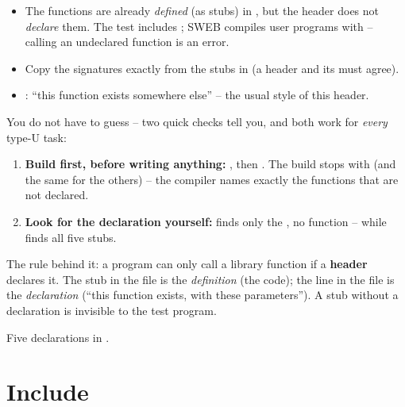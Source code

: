 \documentclass[11pt]{report}
\newcommand{\done}[1]{\begin{keybox}[title={Done when}]#1\end{keybox}}
\begin{document}
\begin{itemize}
  \item The functions are already \emph{defined} (as stubs) in , but the header does not
        \emph{declare} them. The test includes ; SWEB compiles user programs with
         -- calling an undeclared function is an error.
  \item Copy the signatures exactly from the stubs in  (a header and its  must agree).
  \item {}: ``this function exists somewhere else'' -- the usual style of this header.
\end{itemize}

\begin{infobox}[title={How would I know that?},fonttitle=\bfseries\small,coltitle=white,colbacktitle=newrule]
You do not have to guess -- two quick checks tell you, and both work for \emph{every} type-U task:
\begin{enumerate}
  \item \textbf{Build first, before writing anything:} , then . The
        build stops with  (and the
        same for the others) -- the compiler names exactly the functions that are not declared.
  \item \textbf{Look for the declaration yourself:} 
        finds only the , no function -- while
         finds all five stubs.
\end{enumerate}
The rule behind it: a program can only call a library function if a \textbf{header} declares it. The
stub in the  file is the \emph{definition} (the code); the line in the  file is the
\emph{declaration} (``this function exists, with these parameters''). A stub without a declaration
is invisible to the test program.
\end{infobox}

\done{Five declarations in .}

\section{Include  \hfill {\normalsize{}}}
\end{document}
